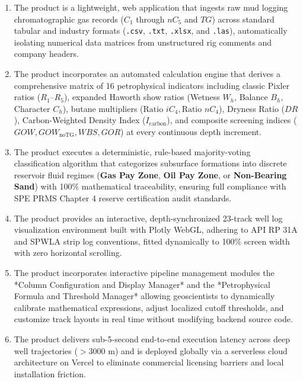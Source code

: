 \begin{enumerate}
    \item The product is a lightweight, web application that ingests raw mud logging chromatographic gas records ($C_1$ through $nC_5$ and $TG$) across standard tabular and industry formats (\texttt{.csv}, \texttt{.txt}, \texttt{.xlsx}, and \texttt{.las}), automatically isolating numerical data matrices from unstructured rig comments and company headers.
    
    \item The product incorporates an automated calculation engine that derives a comprehensive matrix of 16 petrophysical indicators including classic Pixler ratios ($R_1$--$R_5$), expanded Haworth show ratios (Wetness $W_h$, Balance $B_h$, Character $C_h$), butane multipliers ($\text{Ratio } iC_4, \text{Ratio } nC_4$), Dryness Ratio ($DR$), Carbon-Weighted Density Index ($I_{\text{carbon}}$), and composite screening indices ($GOW, GOW_{\text{noTG}}, WBS, GOR$) at every continuous depth increment.
    
    \item The product executes a deterministic, rule-based majority-voting classification algorithm that categorizes subsurface formations into discrete reservoir fluid regimes (\textbf{Gas Pay Zone}, \textbf{Oil Pay Zone}, or \textbf{Non-Bearing Sand}) with 100\% mathematical traceability, ensuring full compliance with SPE PRMS Chapter 4 reserve certification audit standards.
    
    \item The product provides an interactive, depth-synchronized 23-track well log visualization environment built with Plotly WebGL, adhering to API RP 31A and SPWLA strip log conventions, fitted dynamically to 100\% screen width with zero horizontal scrolling.
    
    \item The product incorporates interactive pipeline management modules the *Column Configuration and Display Manager* and the *Petrophysical Formula and Threshold Manager* allowing geoscientists to dynamically calibrate mathematical expressions, adjust localized cutoff thresholds, and customize track layouts in real time without modifying backend source code.
    
    \item The product delivers sub-5-second end-to-end execution latency across deep well trajectories ($> 3000\text{ m}$) and is deployed globally via a serverless cloud architecture on Vercel to eliminate commercial licensing barriers and local installation friction.
\end{enumerate}

